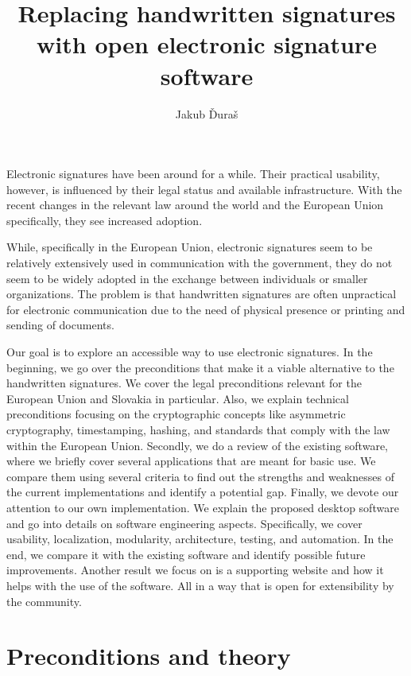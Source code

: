 \documentclass[thesismargins, english, thesislinespacing, onelinechapterstyle, upjsfrontpage]{rnthesis}
\title{Replacing handwritten signatures with open electronic signature software}
\author{Jakub Ďuraš}
\begin{document}
\maketitle

\newpage

\tableofcontents

\uvod

Electronic signatures have been around for a while.
Their practical usability, however, is influenced by their legal status and available infrastructure.
With the recent changes in the relevant law around the world and the European Union specifically, they see increased adoption.

While, specifically in the European Union, electronic signatures seem to be relatively extensively used in communication with the government, they do not seem to be widely adopted in the exchange between individuals or smaller organizations.
The problem is that handwritten signatures are often unpractical for electronic communication due to the need of physical presence or printing and sending of documents.

Our goal is to explore an accessible way to use electronic signatures.
In the beginning, we go over the preconditions that make it a viable alternative to the handwritten signatures.
We cover the legal preconditions relevant for the European Union and Slovakia in particular.
Also, we explain technical preconditions focusing on the cryptographic concepts like asymmetric cryptography, timestamping, hashing, and standards that comply with the law within the European Union.
Secondly, we do a review of the existing software, where we briefly cover several applications that are meant for basic use.
We compare them using several criteria to find out the strengths and weaknesses of the current implementations and identify a potential gap.
Finally, we devote our attention to our own implementation.
We explain the proposed desktop software and go into details on software engineering aspects.
Specifically, we cover usability, localization, modularity, architecture, testing, and automation.
In the end, we compare it with the existing software and identify possible future improvements.
Another result we focus on is a supporting website and how it helps with the use of the software.
All in a way that is open for extensibility by the community.

\chapter{Preconditions and theory}
\end{document}
